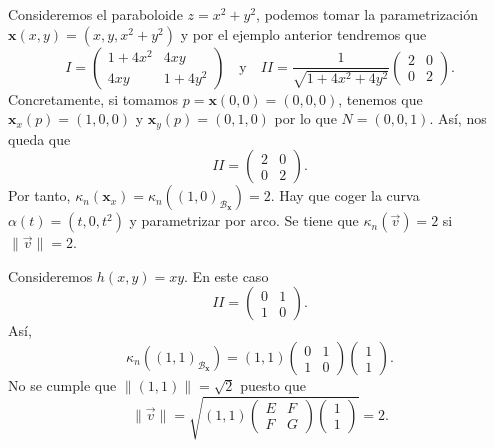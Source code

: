\begin{eg}[Paraboloide]
Consideremos el paraboloide $\displaystyle z = x^{2}+ y^{2} $, podemos tomar la parametrización $\displaystyle \textbf{x} \left(x,y\right)=\left(x,y,x^{2}+y^{2}\right) $ y por el ejemplo anterior tendremos que 
\[I = \begin{pmatrix} 1 + 4x^{2} & 4xy \\ 4xy & 1 + 4y^{2} \end{pmatrix}\quad \text{y} \quad II = \frac{1}{\sqrt{1 + 4x^{2}+4y^{2}}}\begin{pmatrix} 2 & 0 \\ 0 & 2 \end{pmatrix} .\]
Concretamente, si tomamos $\displaystyle p = \textbf{x} \left(0,0\right)=\left(0,0,0\right) $, tenemos que $\displaystyle \textbf{x} _{x}\left(p\right)=\left(1,0,0\right) $ y $\displaystyle \textbf{x} _{y}\left(p\right)=\left(0,1,0\right) $ por lo que $\displaystyle N = \left(0,0,1\right) $. Así, nos queda que 
\[II = \begin{pmatrix} 2 & 0 \\ 0 & 2 \end{pmatrix} .\]
Por tanto, $\displaystyle \kappa_{n}\left( \textbf{x} _{x}\right)=\kappa_{n}\left(\left(1,0\right)_{ \mathcal{B}_{ \textbf{x} }}\right)=2$. Hay que coger la curva $\displaystyle \alpha\left(t\right)=\left(t, 0, t ^{2}\right) $ y parametrizar por arco. Se tiene que $\displaystyle \kappa_{n}\left(\vec{v}\right)=2 $ si $\displaystyle \|\vec{v}\| = 2 $. 
\end{eg}
\begin{eg}
Consideremos $\displaystyle h\left(x,y\right)=xy $. 
En este caso 
\[ II = \begin{pmatrix} 0 & 1 \\ 1 & 0 \end{pmatrix} .\]
Así, 
\[\kappa_{n}\left(\left(1,1\right)_{\mathcal{B}_{ \textbf{x} }}\right)=\left(1,1\right)\begin{pmatrix} 0 & 1 \\ 1 & 0 \end{pmatrix}\begin{pmatrix} 1 \\ 1 \end{pmatrix} .\]
No se cumple que $\displaystyle \|\left(1,1\right)\|=\sqrt{2} $ puesto que 
\[\|\vec{v}\| = \sqrt{\left(1,1\right)\begin{pmatrix} E & F \\ F & G \end{pmatrix}\begin{pmatrix} 1 \\ 1 \end{pmatrix}} = 2 .\]
\end{eg}
